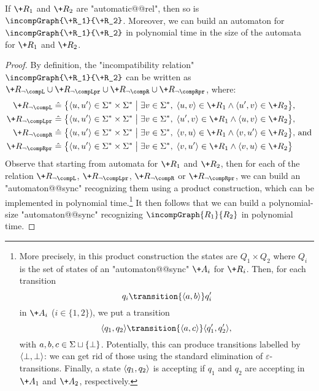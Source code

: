 \begin{proposition}
    \AP\label{prop:incomp-is-automatic}
    If $\+R_1$ and $\+R_2$ are "automatic@@rel", then so is $\incompGraph{\+R_1}{\+R_2}$.
    Moreover, we can build an automaton for $\incompGraph{\+R_1}{\+R_2}$ in polynomial time in the size of the automata for $\+R_1$ and $\+R_2$.
\end{proposition}

\begin{proof}
    By definition, the "incompatibility relation" $\incompGraph{\+R_1}{\+R_2}$ can be written as
    $\+R_{\neg\compL} \cup \+R_{\neg\compLpr} \cup \+R_{\neg\compR} \cup \+R_{\neg\compRpr}$, where:
    \begin{align*}
        \+R_{\neg\compL} &\defeq \big\{ \tup{u,u'} \in \Sigma^* \times \Sigma^* \;\big\vert\; \exists v \in \Sigma^*,\; \tup{u,v} \in \+R_1 \land \tup{u',v} \in \+R_2 \big\} \text{,}\\
        \+R_{\neg\compLpr} &\defeq \big\{ \tup{u,u'} \in \Sigma^* \times \Sigma^* \;\big\vert\; \exists v \in \Sigma^*,\; \tup{u',v} \in \+R_1 \land \tup{u,v} \in \+R_2 \big\} \text{,}\\
        \+R_{\neg\compR} &\defeq \big\{ \tup{u,u'} \in \Sigma^* \times \Sigma^* \;\big\vert\; \exists v \in \Sigma^*,\; \tup{v,u} \in \+R_1 \land \tup{v,u'} \in \+R_2 \big\} \text{, and}\\
        \+R_{\neg\compRpr} &\defeq \big\{ \tup{u,u'} \in \Sigma^* \times \Sigma^* \;\big\vert\; \exists v \in \Sigma^*,\; \tup{v,u'} \in \+R_1 \land \tup{v,u} \in \+R_2 \big\}
    \end{align*}
    Observe that starting from automata for $\+R_1$ and $\+R_2$, then for each
    of the relation $\+R_{\neg\compL}$, $\+R_{\neg\compLpr}$, $\+R_{\neg\compR}$ or $\+R_{\neg\compRpr}$, we can build an "automaton@@sync" recognizing them
    using a product construction, which can be implemented in polynomial time.\footnote{More precisely, in this product construction the states are $Q_1 \times Q_2$
    where $Q_i$ is the set of states of an "automaton@@sync" $\+A_i$ for $\+R_i$. Then,
    for each transition
    \[
        q_i \transition{\tup{a,b}} q'_i
    \]
    in $\+A_i$
    ($i \in \{1,2\}$), we put a transition
    \[
        \tup{q_1,q_2} \transition{\tup{a,c}} \tup{q'_1,q'_2},
    \]
    with $a,b,c \in \Sigma\sqcup\{\bot\}$. Potentially, this
    can produce transitions labelled by $\langle\bot,\bot\rangle$: we can get rid of those
    using the standard elimination of $\varepsilon$-transitions.
    Finally, a state $\langle q_1,q_2\rangle$ is accepting if $q_1$ and $q_2$ are accepting
    in $\+A_1$ and $\+A_2$, respectively.}
    It then follows that we can build a polynomial-size "automaton@@sync" recognizing
    $\incompGraph{R_1}{R_2}$ in polynomial time.
\end{proof}

